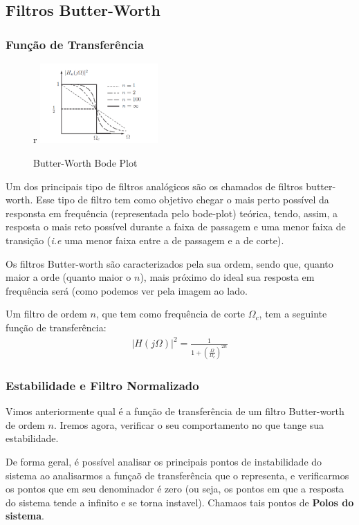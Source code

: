 \documentclass{article}
\begin{document}
\newpage
\subsection{Filtros Butter-Worth}

\subsubsection{Função de Transferência}
\begin{figure}{r}
    \centering
    \includegraphics[width=0.4\textwidth]{imgs/butter_worth_tf.jpeg}
    \caption{Butter-Worth Bode Plot}
    \label{fig:enter-label}
\end{figure}
Um dos principais tipo de filtros analógicos são os chamados de filtros butter-worth. Esse tipo de filtro tem como objetivo chegar o mais perto possível da responsta em frequência (representada pelo bode-plot) teórica, tendo, assim, a resposta o mais reto possível durante a faixa de passagem e uma menor faixa de transição (\emph{i.e} uma menor faixa entre a de passagem e a de corte).

Os filtros Butter-worth são caracterizados pela sua ordem, sendo que, quanto maior a orde (quanto maior o $n$), mais próximo do ideal sua resposta em frequência será (como podemos ver pela imagem ao lado.

Um filtro de ordem $n$, que tem como frequência de corte $\Omega_c$, tem a seguinte função de transferência:
\begin{align}
    |H(j\Omega)|^2 = \frac{1}{1 + \left( \frac{\Omega}{\Omega_c}\right)^{2n}}
    \label{eq:tf_butterworth}
\end{align}

\subsubsection{Estabilidade e Filtro Normalizado}
Vimos anteriormente qual é a função de transferência de um filtro Butter-worth de ordem $n$. Iremos agora, verificar o seu comportamento no que tange sua estabilidade. 

De forma geral, é possível analisar os principais pontos de instabilidade do sistema ao analisarmos a funçaõ de transferência que o representa, e verificarmos os pontos que em seu denominador é zero (ou seja, os pontos em que a resposta do sistema tende a infinito e se torna instavel). Chamaos tais pontos de \textbf{Polos do sistema}.
\end{document}
